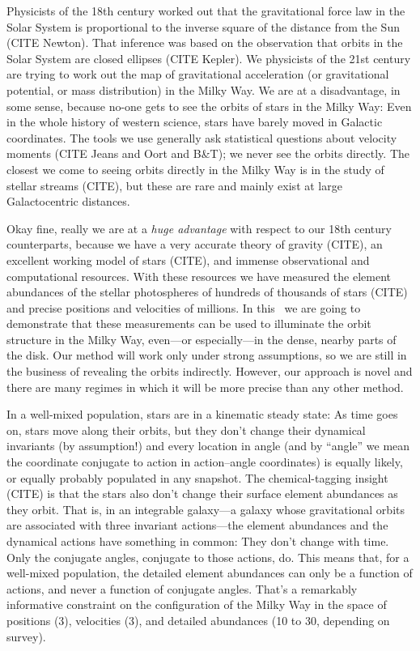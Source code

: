 \documentclass[modern]{aastex63}
\begin{document}
Physicists of the 18th century worked out that the gravitational force
law in the Solar System is proportional to the inverse square of the
distance from the Sun (CITE Newton).
That inference was based on the observation that orbits in the Solar
System are closed ellipses (CITE Kepler).
We physicists of the 21st century are trying to work out the map of
gravitational acceleration (or gravitational
potential, or mass distribution) in the Milky Way.
We are at a disadvantage, in some sense, because no-one gets to see
the orbits of stars in the Milky Way: Even in the whole history of
western science, stars have barely moved in Galactic coordinates.
The tools we use generally ask statistical questions about velocity
moments (CITE Jeans and Oort and B\&T); we never see the orbits directly.
The closest we come to seeing orbits directly in the Milky Way is in the
study of stellar streams (CITE), but these are rare and mainly exist at large
Galactocentric distances.

Okay fine, really we are at a \emph{huge advantage} with respect to
our 18th century counterparts, because we have a very accurate theory
of gravity (CITE), an excellent working model of stars (CITE),
and immense observational and computational resources.
With these resources we have measured the element abundances of the
stellar photospheres of hundreds of thousands of stars (CITE) and
precise positions and velocities of millions.
In this \documentname\ we are going to demonstrate that these
measurements can be used to illuminate the orbit structure in the
Milky Way, even---or especially---in the dense, nearby parts of the
disk.
Our method will work only under strong assumptions, so we are
still in the business of revealing the orbits indirectly.
However, our approach is novel and there are many regimes in which it
will be more precise than any other method.

In a well-mixed population, stars are in a kinematic steady state:
As time goes on, stars move along their orbits, but they don't change their dynamical
invariants (by assumption!) and every location in angle (and by ``angle'' we mean the
coordinate conjugate to action in action--angle coordinates) is equally likely, or
equally probably populated in any snapshot.
The chemical-tagging insight (CITE) is that the stars also don't change
their surface element abundances as they orbit.
That is, in an integrable galaxy---a galaxy whose gravitational orbits
are associated with three invariant actions---the element abundances and
the dynamical actions have something in common:
They don't change with time.
Only the conjugate angles, conjugate to those actions, do.
This means that, for a well-mixed population, the detailed element abundances can only
be a function of actions, and never a function of conjugate angles.
That's a remarkably informative constraint on the configuration of the Milky Way in
the space of positions (3), velocities (3), and detailed abundances (10 to 30, depending
on survey).
\end{document}
